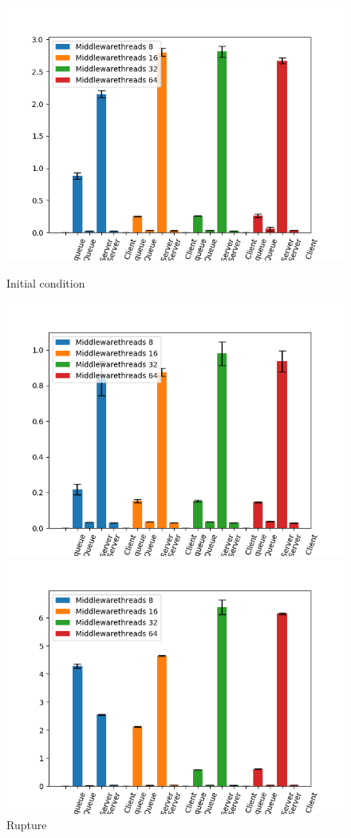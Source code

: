 \documentclass[11pt,a4paper]{article}
\begin{document}
\begin{figure}[!ht]
\begin{minipage}[b]{0.5\linewidth}
  \end{minipage} 
    \begin{minipage}[b]{0.5\linewidth}
    \centering
    \includegraphics[width=0.7\linewidth]{img/exp3_1/exp3_1_mw_percentile_plots_writes_0__vc_2.png} 
    \caption{Initial condition} 
    \vspace{4ex}
  \end{minipage}%
  \begin{minipage}[b]{0.5\linewidth}
    \centering
    \includegraphics[width=0.7\linewidth]{img/exp3_1/exp3_1_mw_percentile_plots_writes_1__vc_2.png} 
    \caption{Rupture} 
    \vspace{4ex}
  \end{minipage} 
  \begin{minipage}[b]{0.5\linewidth}
    \centering
    \includegraphics[width=0.7\linewidth]{img/exp3_1/exp3_1_mw_percentile_plots_writes_0__vc_4.png} 

\end{minipage}
\end{figure}
\end{document}
